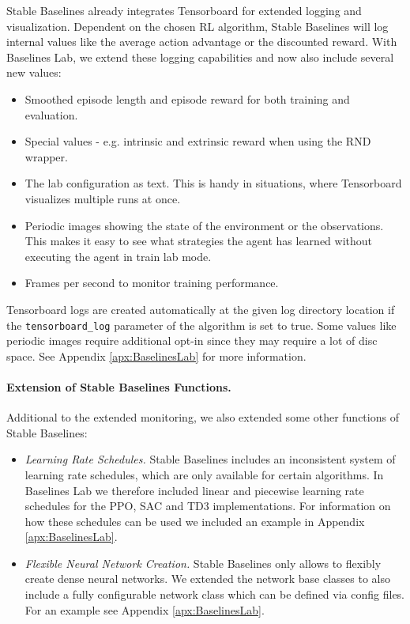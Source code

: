 Stable Baselines already integrates Tensorboard for extended logging and visualization. Dependent on the chosen RL algorithm, Stable Baselines will log internal values like the average action advantage or the discounted reward. With Baselines Lab, we extend these logging capabilities and now also include several new values:

\begin{itemize}
    \item Smoothed episode length and episode reward for both training and evaluation.
    \item Special values - e.g. intrinsic and extrinsic reward when using the RND wrapper.
    \item The lab configuration as text. This is handy in situations, where Tensorboard visualizes multiple runs at once.
    \item Periodic images showing the state of the environment or the observations. This makes it easy to see what strategies the agent has learned without executing the agent in train lab mode.
    \item Frames per second to monitor training performance.
\end{itemize}

Tensorboard logs are created automatically at the given log directory location if the \texttt{tensorboard\_log} parameter of the algorithm is set to true. Some values like periodic images require additional opt-in since they may require a lot of disc space. See Appendix \ref{apx:BaselinesLab} for more information.

\paragraph{Extension of Stable Baselines Functions.}
Additional to the extended monitoring, we also extended some other functions of Stable Baselines:

\begin{itemize}
    \item \textit{Learning Rate Schedules.} Stable Baselines includes an inconsistent system of learning rate schedules, which are only available for certain algorithms. In Baselines Lab we therefore included linear and piecewise learning rate schedules for the PPO, SAC and TD3 implementations. For information on how these schedules can be used we included an example in Appendix \ref{apx:BaselinesLab}.
    \item \textit{Flexible Neural Network Creation.} Stable Baselines only allows to flexibly create dense neural networks. We extended the network base classes to also include a fully configurable network class which can be defined via config files. For an example see Appendix \ref{apx:BaselinesLab}.
\end{itemize}


